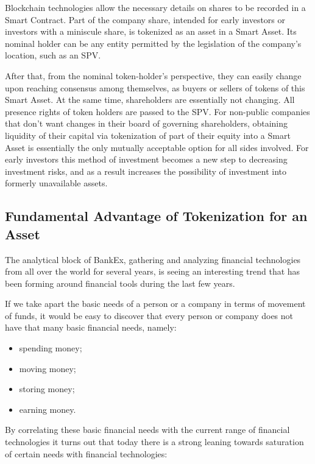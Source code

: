 \documentclass{article}
\begin{document}
\begin{multicols}{2}
Blockchain technologies allow the necessary details on shares to be recorded in a Smart Contract. Part of the company share, intended for early investors or investors with a miniscule share, is tokenized as an asset in a Smart Asset. Its nominal holder can be any entity permitted by the legislation of the company’s location, such as an SPV. 

After that, from the nominal token-holder’s perspective, they can easily change upon reaching consensus among themselves, as buyers or sellers of tokens of this Smart Asset. At the same time, shareholders are essentially not changing. All presence rights of token holders are passed to the SPV. For non-public companies that don’t want changes in their board of governing shareholders, obtaining liquidity of their capital via tokenization of part of their equity into a Smart Asset is essentially the only mutually acceptable option for all sides involved. 
For early investors this method of investment becomes a new step to decreasing investment risks, and as a result increases the possibility of investment into formerly unavailable assets.

\subsection{Fundamental Advantage of Tokenization for an Asset}

The analytical block of BankEx, gathering and analyzing financial technologies from all over the world for several years, is seeing an interesting trend that has been forming around financial tools during the last few years. 

If we take apart the basic needs of a person or a company in terms of movement of funds, it would be easy to discover that every person or company does not have that many basic financial needs, namely:
    
\begin{itemize}
\item spending money;
\item moving money;
\item storing money;
\item earning money.
\end{itemize}

By correlating these basic financial needs with the current range of financial technologies it turns out that today there is a strong leaning towards saturation of certain needs with financial technologies:


\end{multicols}
\end{document}
